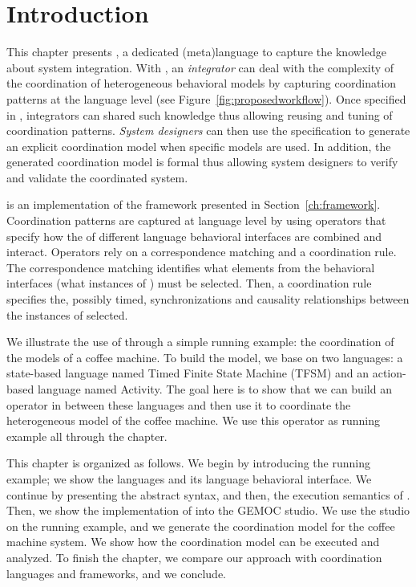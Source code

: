 \section{Introduction}
\label{sec:bcoolintro}
This chapter presents \bcool, a dedicated (meta)language to capture the knowledge about system integration. With \bcool, an \emph{integrator} can deal with the complexity of the coordination of heterogeneous behavioral models by capturing coordination patterns at the language level (see Figure~\ref{fig:proposedworkflow}). Once specified in \bcool, integrators can shared such knowledge thus allowing reusing and tuning of coordination patterns. \emph{System designers} can then use the \bcool specification to generate an explicit coordination model when specific models are used. In addition, the generated coordination model is formal thus allowing system designers to verify and validate the coordinated system.     
	
\bcool is an implementation of the framework presented in Section~\ref{ch:framework}. Coordination patterns are captured at language level by using operators that specify how the \dse of different language behavioral interfaces are combined and interact. Operators rely on a correspondence matching and a coordination rule. The correspondence matching identifies what elements from the behavioral interfaces (\ie what instances of \dse) must be selected. Then, a coordination rule specifies the, possibly timed, synchronizations and causality relationships between the instances of \dse selected.

We illustrate the use of \bcool through a simple running example: the coordination of the models of a coffee machine. To build the model, we base on two languages: a state-based language named Timed Finite State Machine (TFSM) and an action-based language named Activity. The goal here is to show that we can build an operator in \bcool between these languages and then use it to coordinate the heterogeneous model of the coffee machine. We use this operator as running example all through the chapter. 
	
This chapter is organized as follows. We begin by introducing the running example; we show the languages and its language behavioral interface. We continue by presenting the abstract syntax, and then, the execution semantics of \bcool. Then, we show the implementation of \bcool into the GEMOC studio. We use the studio on the running example, and we generate the coordination model for the coffee machine system. We show how the coordination model can be executed and analyzed. To finish the chapter, we compare our approach with coordination languages and frameworks, and we conclude.

